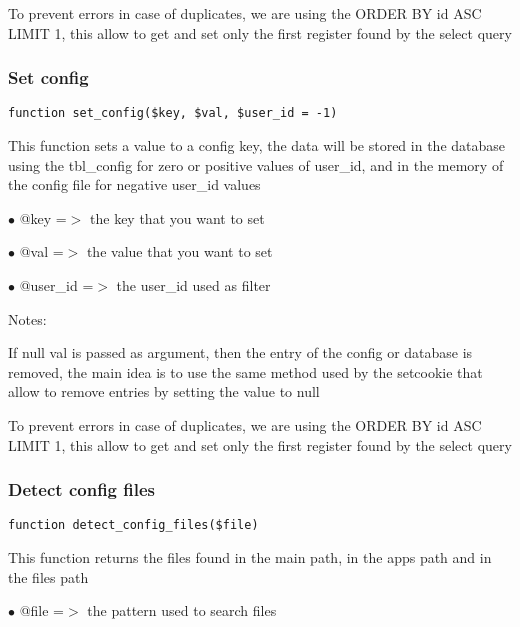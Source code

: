 \documentclass[a4paper]{article}
\begin{document}
To prevent errors in case of duplicates, we are using the ORDER BY id ASC
LIMIT 1, this allow to get and set only the first register found by the
select query

\hypertarget{toc79}{}
\subsubsection{Set config}

\begin{lstlisting}
function set_config($key, $val, $user_id = -1)
\end{lstlisting}

This function sets a value to a config key, the data will be stored in the
database using the tbl\_config for zero or positive values of user\_id, and
in the memory of the config file for negative user\_id values

\begin{compactitem}
\item[\color{myblue}$\bullet$] @key     =$>$ the key that you want to set
\item[\color{myblue}$\bullet$] @val     =$>$ the value that you want to set
\item[\color{myblue}$\bullet$] @user\_id =$>$ the user\_id used as filter
\end{compactitem}

Notes:

If null val is passed as argument, then the entry of the config or database
is removed, the main idea is to use the same method used by the setcookie
that allow to remove entries by setting the value to null

To prevent errors in case of duplicates, we are using the ORDER BY id ASC
LIMIT 1, this allow to get and set only the first register found by the
select query

\hypertarget{toc80}{}
\subsubsection{Detect config files}

\begin{lstlisting}
function detect_config_files($file)
\end{lstlisting}

This function returns the files found in the main path, in the apps path and in the files path

\begin{compactitem}
\item[\color{myblue}$\bullet$] @file =$>$ the pattern used to search files
\end{compactitem}
\end{document}
